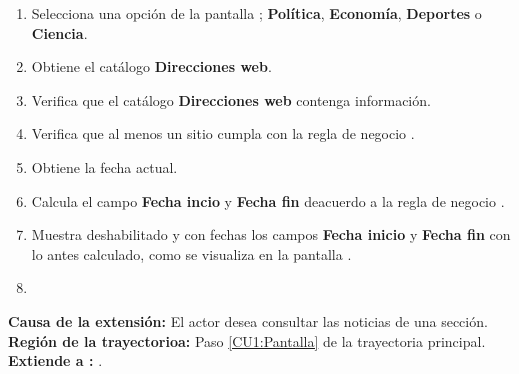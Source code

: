 \begin{enumerate}[1.]
	
	\item \actor Selecciona una opción de la pantalla ; \textbf{Política}, \textbf{Economía}, \textbf{Deportes} o \textbf{Ciencia}. 
	
	\item \sistema Obtiene el catálogo \textbf{Direcciones web}.
	
	\item \sistema Verifica que el catálogo \textbf{Direcciones web} contenga información. 
	
	\item \sistema Verifica que al menos un sitio cumpla con la regla de negocio . 

	\item \sistema Obtiene la fecha actual.

	\item \sistema \label{CU1:FechaI}Calcula el campo \textbf{Fecha incio} y \textbf{Fecha fin} deacuerdo a la regla de negocio .

	\item \label{CU1:Pantalla}\sistema Muestra deshabilitado y con fechas los campos \textbf{Fecha inicio} y \textbf{Fecha fin} con lo antes calculado, como se visualiza en la pantalla .
	
	\item \finCU	

\end{enumerate}




\textbf{Causa de la extensión:} El actor desea consultar las noticias de una sección.\\
\textbf{Región de la trayectorioa:} Paso \ref{CU1:Pantalla} de la trayectoria principal.\\
\textbf{Extiende a :} .\\\\



